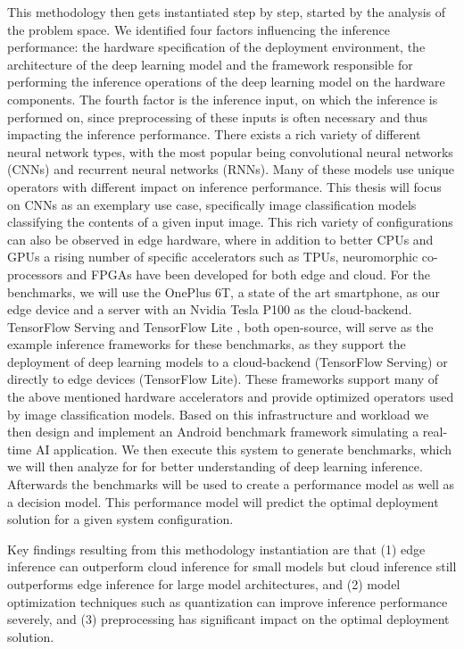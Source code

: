 This methodology then gets instantiated step by step, started by the analysis of the problem space.
We identified four factors influencing the inference performance: the hardware specification of the deployment environment, the architecture of the deep learning model and the framework responsible for performing the inference operations of the deep learning model on the hardware components. The fourth factor is the inference input, on which the inference is performed on, since preprocessing of these inputs is often necessary and thus impacting the inference performance.
There exists a rich variety of different neural network types, with the most popular being convolutional neural networks (CNNs) and recurrent neural networks (RNNs).
Many of these models use unique operators with different impact on inference performance.
This thesis will focus on CNNs as an exemplary use case, specifically image classification models classifying the contents of a given input image.
This rich variety of configurations can also be observed in edge hardware, where in addition to better CPUs and GPUs a rising number of specific accelerators such as TPUs, neuromorphic co-processors and FPGAs have been developed for both edge and cloud.
For the benchmarks, we will use the OnePlus 6T, a state of the art smartphone, as our edge device and a server with an Nvidia Tesla P100 as the cloud-backend.
TensorFlow Serving \cite{tfServing} and TensorFlow Lite \cite{tfLite}, both open-source, will serve as the example inference frameworks for these benchmarks, as they support the deployment of deep learning models to a cloud-backend (TensorFlow Serving) or directly to edge devices (TensorFlow Lite). These frameworks support many of the above mentioned hardware accelerators and provide optimized operators used by image classification models.
Based on this infrastructure and workload we then design and implement an Android benchmark framework simulating a real-time AI application.
We then execute this system to generate benchmarks, which we will then analyze for for better understanding of deep learning inference. Afterwards the benchmarks will be used to create a performance model as well as a decision model.
This performance model will predict the optimal deployment solution for a given system configuration.

Key findings resulting from this methodology instantiation are that (1) edge inference can outperform cloud inference for small models but cloud inference still outperforms edge inference for large model architectures, and (2) model optimization techniques such as quantization can improve inference performance severely, and (3) preprocessing has significant impact on the optimal deployment solution.

